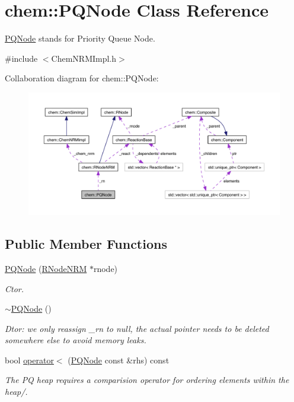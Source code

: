 \hypertarget{classchem_1_1PQNode}{\section{chem\-:\-:P\-Q\-Node Class Reference}
\label{classchem_1_1PQNode}
}


\hyperlink{classchem_1_1PQNode}{P\-Q\-Node} stands for Priority Queue Node.  




{\ttfamily \#include $<$Chem\-N\-R\-M\-Impl.\-h$>$}



Collaboration diagram for chem\-:\-:P\-Q\-Node\-:\nopagebreak
\begin{figure}[H]
\begin{center}
\leavevmode
\includegraphics[width=350pt]{classchem_1_1PQNode__coll__graph}
\end{center}
\end{figure}
\subsection*{Public Member Functions}
\begin{DoxyCompactItemize}
\item 
\hyperlink{classchem_1_1PQNode_a216292a150c44b3f2bfeca4518663663}{P\-Q\-Node} (\hyperlink{classchem_1_1RNodeNRM}{R\-Node\-N\-R\-M} $\ast$rnode)
\begin{DoxyCompactList}\small\item\em Ctor. \end{DoxyCompactList}\item 
\hyperlink{classchem_1_1PQNode_a12604503b292d71658be54c9952afcbd}{$\sim$\-P\-Q\-Node} ()
\begin{DoxyCompactList}\small\item\em Dtor\-: we only reassign \-\_\-rn to null, the actual pointer needs to be deleted somewhere else to avoid memory leaks. \end{DoxyCompactList}\item 
bool \hyperlink{classchem_1_1PQNode_a0ba52697bcbc5b2c4accb7dece0aff24}{operator$<$} (\hyperlink{classchem_1_1PQNode}{P\-Q\-Node} const \&rhs) const 
\begin{DoxyCompactList}\small\item\em The P\-Q heap requires a comparision operator for ordering elements within the heap/. \end{DoxyCompactList}\end{DoxyCompactItemize}
